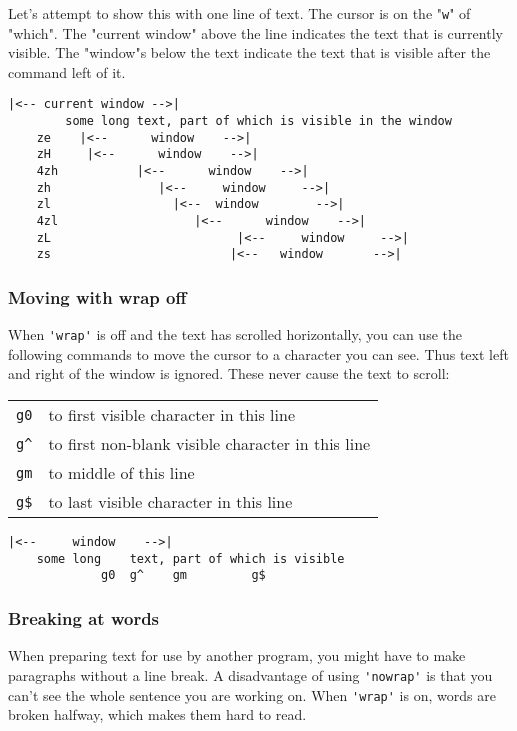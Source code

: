 Let's attempt to show this with one line of text.
The cursor is on the "\verb!w!" of "which".
The "current window" above the line indicates the text that is currently visible.
The "window"s below the text indicate the text that is visible after the command left of it.

\begin{Verbatim}[samepage=true]
                      |<-- current window -->|
        some long text, part of which is visible in the window 
    ze    |<--      window    -->|
    zH     |<--      window    -->|
    4zh           |<--      window    -->|
    zh               |<--     window     -->|
    zl                 |<--  window        -->|
    4zl                   |<--      window    -->|
    zL                          |<--     window     -->|
    zs                         |<--   window       -->|
\end{Verbatim}

\subsubsection{Moving with wrap off}
When \verb!'wrap'! is off and the text has scrolled horizontally, you can use the following commands to move the cursor to a character you can see.
Thus text left and right of the window is ignored.
These never cause the text to scroll:

\begin{center} \begin{tabular}{c l}
				\verb!g0! & to first visible character in this line \\
				\verb!g^! & to first non-blank visible character in this line \\
				\verb!gm! & to middle of this line \\
				\verb!g$! & to last visible character in this line \\
\end{tabular} \end{center}

\begin{Verbatim}[samepage=true]
            |<--     window    -->|
    some long    text, part of which is visible 
             g0  g^    gm         g$
\end{Verbatim}

\subsubsection{Breaking at words}
\label{edit-no-break}
When preparing text for use by another program, you might have to make paragraphs without a line break.
A disadvantage of using \verb!'nowrap'! is that you can't see the whole sentence you are working on.
When \verb!'wrap'! is on, words are broken halfway, which makes them hard to read.

